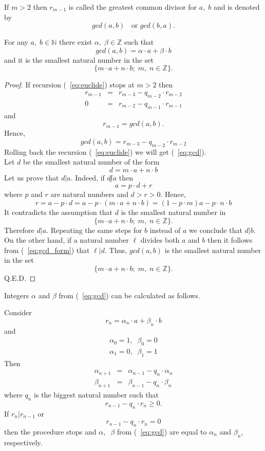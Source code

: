 \documentclass[color=black,11pt]{elegantpaper}
\begin{document}
If $m>2$ then $r_{m-1}$ is called the greatest common divisor for $a, \;b$ and is denoted by
$$
gcd(a,b)\;\;\mbox{ or } gcd(b,a).
$$
\begin{theorem}
For any $a,\;b \in \mathbb{N}$ there exist $\alpha,\;\beta \in \mathbb{Z}$ such that
\begin{equation}
\label{eq:gcd}
gcd(a,b) = \alpha \cdot a + \beta \cdot b
\end{equation}
and it is the smallest natural number in the set
$$
\{m \cdot a + n \cdot b ;\; m,\; n \in \mathbb{Z} \}.
$$
\end{theorem}
\begin{proof}
If recursion (~\ref{eq:euclide}) stops at $m>2$ then
\begin{eqnarray*}
r_{m-1} &=& r_{m-3}-q_{m-2} \cdot r_{m-2}\\
0 &=& r_{m-2}-q_{m-1} \cdot r_{m-1}
\end{eqnarray*}
and
$$
r_{m-1}=gcd(a,b).
$$
Hence,
\begin{equation*}
gcd(a,b) = r_{m-3}-q_{m-2} \cdot r_{m-2}
\end{equation*}
Rolling back the recursion (~\ref{eq:euclide}) we will get (~\ref{eq:gcd}).\\

Let $d$ be the smallest natural number of the form
\begin{equation}
\label{eq:gcd_form}
d = m \cdot a + n \cdot b
\end{equation} 
Let us prove that $d | a.$ Indeed, if $d \not| a$ then
$$
a = p\cdot d + r 
$$ 
where $p$ and $r$ are natural numbers and $d> r> 0.$ Hence,
$$
r = a -  p\cdot d = a -p \cdot (m \cdot a + n \cdot b) = (1-p \cdot m) a - p\cdot n \cdot b
$$
It contradicts the assumption that $d$ is the smallest natural number in
$$
\{m \cdot a + n \cdot b ;\; m,\; n \in \mathbb{Z} \}.
$$
Therefore $d | a.$ Repeating the same steps for $b$ instead of $a$ we conclude that $d | b.$ On the other hand, if a natural number $\ell$ divides both $a$ and $b$ then it follows from (~\ref{eq:gcd_form}) that $\ell | d.$ Thus, $gcd(a,b)$ is the smallest natural number in the set
$$
\{m \cdot a + n \cdot b ;\; m,\; n \in \mathbb{Z} \}.
$$
\vspace{0.1cm}
Q.E.D.
\vspace{0.1cm}
\end{proof}

Integers $\alpha$ and $\beta$ from (~\ref{eq:gcd}) can be calculated as follows.

Consider
$$
r_n = \alpha_n \cdot a + \beta_n \cdot b
$$
and 
\begin{eqnarray*}
 \alpha_0 =1,\;\;\beta_0=0\\
 \alpha_1 =0,\;\;\beta_1=1
\end{eqnarray*}
Then
\begin{eqnarray*}
\alpha_{n+1} &=& \alpha_{n-1} - q_n \cdot \alpha_n\\
\beta_{n+1} &=& \beta_{n-1} - q_n \cdot \beta_n
\end{eqnarray*}
where $q_n$ is the biggest natural number such that
$$
r_{n-1}- q_n \cdot r_n \ge 0.
$$
If $ r_n | r_{n-1}$ or
$$
r_{n-1}- q_n \cdot r_n =0 
$$
then the procedure stops and $\alpha ,\;\; \beta$ from (~\ref{eq:gcd}) are equal to  $\alpha_n$ and $\beta_n,$ respectively.
\end{document}
